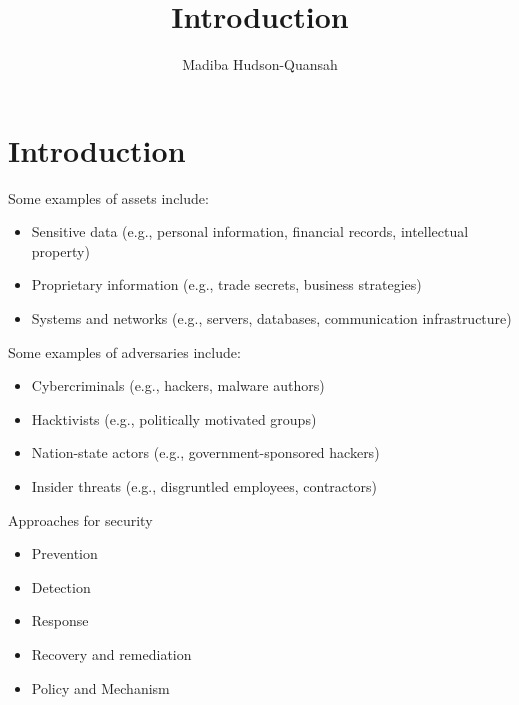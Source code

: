 \documentclass[12pt letter]{report}
\title{\Huge{Introduction}}
\author{\huge{Madiba Hudson-Quansah}}
\date{}
\begin{document}
\maketitle
\newpage
{}
\tableofcontents
\pagebreak

\chapter{Introduction}



Some examples of assets include:
\begin{itemize}
  \item Sensitive data (e.g., personal information, financial records, intellectual property)
  \item Proprietary information (e.g., trade secrets, business strategies)
  \item Systems and networks (e.g., servers, databases, communication infrastructure)
\end{itemize}


Some examples of adversaries include:
\begin{itemize}
  \item Cybercriminals (e.g., hackers, malware authors)
  \item Hacktivists (e.g., politically motivated groups)
  \item Nation-state actors (e.g., government-sponsored hackers)
  \item Insider threats (e.g., disgruntled employees, contractors)
\end{itemize}

Approaches for security
\begin{itemize}
  \item Prevention
  \item Detection
  \item Response
  \item Recovery and remediation
  \item Policy and Mechanism
\end{itemize}
\end{document}
